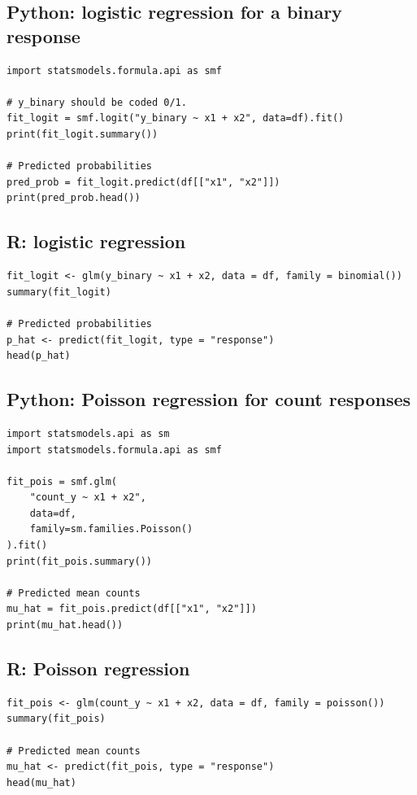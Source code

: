 \subsection*{Python: logistic regression for a binary response}

\begin{verbatim}
import statsmodels.formula.api as smf

# y_binary should be coded 0/1.
fit_logit = smf.logit("y_binary ~ x1 + x2", data=df).fit()
print(fit_logit.summary())

# Predicted probabilities
pred_prob = fit_logit.predict(df[["x1", "x2"]])
print(pred_prob.head())
\end{verbatim}

\subsection*{R: logistic regression}

\begin{verbatim}
fit_logit <- glm(y_binary ~ x1 + x2, data = df, family = binomial())
summary(fit_logit)

# Predicted probabilities
p_hat <- predict(fit_logit, type = "response")
head(p_hat)
\end{verbatim}

\subsection*{Python: Poisson regression for count responses}

\begin{verbatim}
import statsmodels.api as sm
import statsmodels.formula.api as smf

fit_pois = smf.glm(
    "count_y ~ x1 + x2",
    data=df,
    family=sm.families.Poisson()
).fit()
print(fit_pois.summary())

# Predicted mean counts
mu_hat = fit_pois.predict(df[["x1", "x2"]])
print(mu_hat.head())
\end{verbatim}

\subsection*{R: Poisson regression}

\begin{verbatim}
fit_pois <- glm(count_y ~ x1 + x2, data = df, family = poisson())
summary(fit_pois)

# Predicted mean counts
mu_hat <- predict(fit_pois, type = "response")
head(mu_hat)
\end{verbatim}

